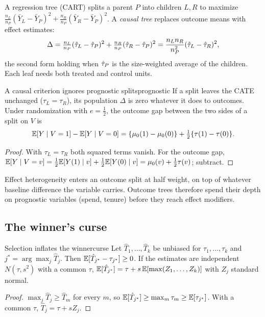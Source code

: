 \documentclass[11pt]{article}
\begin{document}
A regression tree (CART) splits a parent $P$ into children $L, R$ to maximize
$\tfrac{n_L}{n_P}(\bar Y_L - \bar Y_P)^2 + \tfrac{n_R}{n_P}(\bar Y_R - \bar Y_P)^2$. A \emph{causal tree} replaces outcome
means with effect estimates:
\[
  \Delta = \tfrac{n_L}{n_P}(\hat{\tau}_L - \hat{\tau}_P)^2 + \tfrac{n_R}{n_P}(\hat{\tau}_R - \hat{\tau}_P)^2
  = \frac{n_L n_R}{n_P^2}(\hat{\tau}_L - \hat{\tau}_R)^2 ,
\]
the second form holding when $\hat{\tau}_P$ is the size-weighted average of the children. Each leaf needs both
treated and control units.

\begin{prop}{A causal criterion ignores prognostic splits}{prognostic}
If a split leaves the CATE unchanged ($\tau_L = \tau_R$), its population $\Delta$ is zero whatever it does to
outcomes. Under randomization with $e = \tfrac12$, the outcome gap between the two sides of a split on $V$ is
\[
  \mathbb{E}[Y \mid V=1] - \mathbb{E}[Y \mid V=0] = \{\mu_0(1) - \mu_0(0)\} + \tfrac12\{\tau(1) - \tau(0)\}.
\]
\end{prop}
\begin{proof}
With $\tau_L = \tau_R$ both squared terms vanish. For the outcome gap,
$\mathbb{E}[Y \mid V=v] = \tfrac12\mathbb{E}[Y(1) \mid v] + \tfrac12\mathbb{E}[Y(0) \mid v] = \mu_0(v) + \tfrac12\tau(v)$; subtract.
\end{proof}

Effect heterogeneity enters an outcome split at half weight, on top of whatever baseline difference the variable
carries. Outcome trees therefore spend their depth on prognostic variables (spend, tenure) before they reach
effect modifiers.

\subsection{The winner's curse}

\begin{prop}{Selection inflates the winner}{curse}
Let $\hat T_1, \dots, \hat T_k$ be unbiased for $\tau_1, \dots, \tau_k$ and $j^\ast = \arg\max_j \hat T_j$. Then
$\mathbb{E}[\hat T_{j^\ast} - \tau_{j^\ast}] \ge 0$. If the estimates are independent $N(\tau, s^2)$ with a common $\tau$,
$\mathbb{E}[\hat T_{j^\ast}] = \tau + s\,\mathbb{E}[\max(Z_1, \dots, Z_k)]$ with $Z_j$ standard normal.
\end{prop}
\begin{proof}
$\max_j \hat T_j \ge \hat T_m$ for every $m$, so $\mathbb{E}[\hat T_{j^\ast}] \ge \max_m \tau_m \ge \mathbb{E}[\tau_{j^\ast}]$. With a common
$\tau$, $\hat T_j = \tau + sZ_j$.
\end{proof}
\end{document}
